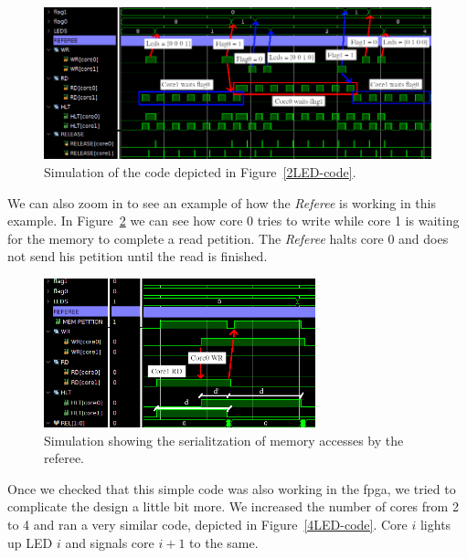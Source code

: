 \begin{figure}[h!]
    \centering
    \includegraphics[width=1.0\textwidth]{images/flag2_sim_crop_arrows.png}
    \caption{Simulation of the code depicted in Figure~\ref{2LED-code}.}
    \label{2LED-sim}
\end{figure}


We can also zoom in to see an example of how the \textit{Referee} is working in this example. In Figure~\ref{2LED-close} we can see how core 0 tries to write while core 1 is waiting for the memory to complete a read petition.
The \textit{Referee} halts core 0 and does not send his petition until the read is finished.

\begin{figure}[h!]
    \centering
    \includegraphics[width=0.7\textwidth]{images/flag2_sim_close_arrow.png}
    \caption{Simulation showing the serialitzation of memory accesses by the referee.}
    \label{2LED-close}
\end{figure}

Once we checked that this simple code was also working in the \gls{fpga}, we tried to complicate the design a little bit more.
We increased the number of cores from 2 to 4 and ran a very similar code, depicted in Figure~\ref{4LED-code}.
Core $i$ lights up LED $i$ and signals core $i+1$ to the same.

